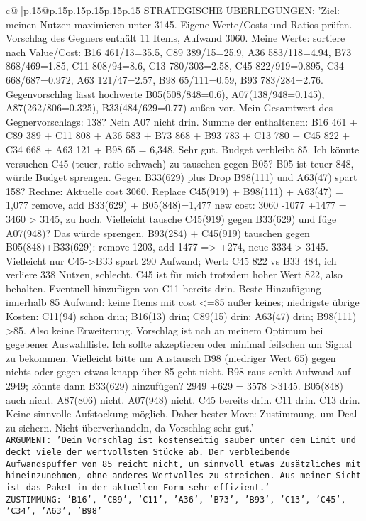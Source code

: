 \documentclass{article}
\begin{document}
{\begin{supertabular}{c@{$\;$}|p{.15\linewidth}@{}p{.15\linewidth}p{.15\linewidth}p{.15\linewidth}p{.15\linewidth}p{.15\linewidth}}
{{{	 STRATEGISCHE ÜBERLEGUNGEN: {'Ziel: meinen Nutzen maximieren unter 3145. Eigene Werte/Costs und Ratios prüfen. Vorschlag des Gegners enthält 11 Items, Aufwand 3060. Meine Werte: sortiere nach Value/Cost: B16 461/13=35.5, C89 389/15=25.9, A36 583/118=4.94, B73 868/469=1.85, C11 808/94=8.6, C13 780/303=2.58, C45 822/919=0.895, C34 668/687=0.972, A63 121/47=2.57, B98 65/111=0.59, B93 783/284=2.76. Gegenvorschlag lässt hochwerte B05(508/848=0.6), A07(138/948=0.145), A87(262/806=0.325), B33(484/629=0.77) außen vor. Mein Gesamtwert des Gegnervorschlags: 138? Nein A07 nicht drin. Summe der enthaltenen: B16 461 + C89 389 + C11 808 + A36 583 + B73 868 + B93 783 + C13 780 + C45 822 + C34 668 + A63 121 + B98 65 = 6,348. Sehr gut. Budget verbleibt 85. Ich könnte versuchen C45 (teuer, ratio schwach) zu tauschen gegen B05? B05 ist teuer 848, würde Budget sprengen. Gegen B33(629) plus Drop B98(111) und A63(47) spart 158? Rechne: Aktuelle cost 3060. Replace C45(919) + B98(111) + A63(47) = 1,077 remove, add B33(629) + B05(848)=1,477 new cost: 3060 -1077 +1477 = 3460 > 3145, zu hoch. Vielleicht tausche C45(919) gegen B33(629) und füge A07(948)? Das würde sprengen. B93(284) + C45(919) tauschen gegen B05(848)+B33(629): remove 1203, add 1477 => +274, neue 3334 > 3145. Vielleicht nur C45->B33 spart 290 Aufwand; Wert: C45 822 vs B33 484, ich verliere 338 Nutzen, schlecht. C45 ist für mich trotzdem hoher Wert 822, also behalten. Eventuell hinzufügen von C11 bereits drin. Beste Hinzufügung innerhalb 85 Aufwand: keine Items mit cost <=85 außer keines; niedrigste übrige Kosten: C11(94) schon drin; B16(13) drin; C89(15) drin; A63(47) drin; B98(111) >85. Also keine Erweiterung. Vorschlag ist nah an meinem Optimum bei gegebener Auswahlliste. Ich sollte akzeptieren oder minimal feilschen um Signal zu bekommen. Vielleicht bitte um Austausch B98 (niedriger Wert 65) gegen nichts oder gegen etwas knapp über 85 geht nicht. B98 raus senkt Aufwand auf 2949; könnte dann B33(629) hinzufügen? 2949 +629 = 3578 >3145. B05(848) auch nicht. A87(806) nicht. A07(948) nicht. C45 bereits drin. C11 drin. C13 drin. Keine sinnvolle Aufstockung möglich. Daher bester Move: Zustimmung, um Deal zu sichern. Nicht überverhandeln, da Vorschlag sehr gut.'}\\ \tt ARGUMENT: {'Dein Vorschlag ist kostenseitig sauber unter dem Limit und deckt viele der wertvollsten Stücke ab. Der verbleibende Aufwandspuffer von 85 reicht nicht, um sinnvoll etwas Zusätzliches mit hineinzunehmen, ohne anderes Wertvolles zu streichen. Aus meiner Sicht ist das Paket in der aktuellen Form sehr effizient.'}\\ \tt ZUSTIMMUNG: {'B16', 'C89', 'C11', 'A36', 'B73', 'B93', 'C13', 'C45', 'C34', 'A63', 'B98'} 
	  } 
	   } 
	   } 
	  \\ 
 


\end{supertabular}}
\end{document}
